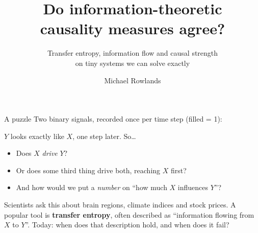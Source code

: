 \documentclass[aspectratio=169,11pt,xcolor={table}]{beamer}
\title{Do information-theoretic\\causality measures agree?}
\subtitle{Transfer entropy, information flow and causal strength\\on tiny systems we can solve exactly}
\author{Michael Rowlands}
\date{}
\begin{document}
\begin{frame}
  \titlepage
\end{frame}

\begin{frame}{A puzzle}
  Two binary signals, recorded once per time step (filled = 1):
  \begin{center}
  \end{center}
  \vspace{-2mm}
  $Y$ looks exactly like $X$, one step later. So\ldots
  \begin{itemize}
    \item Does $X$ \emph{drive} $Y$?
    \item Or does some third thing drive both, reaching $X$ first?
    \item And how would we put a \emph{number} on ``how much $X$ influences $Y$''?
  \end{itemize}
  \medskip
  Scientists ask this about brain regions, climate indices and stock prices.
  A popular tool is \textbf{transfer entropy}, often described as ``information flowing from $X$ to $Y$''.
  Today: when does that description hold, and when does it fail?
\end{frame}
\end{document}
